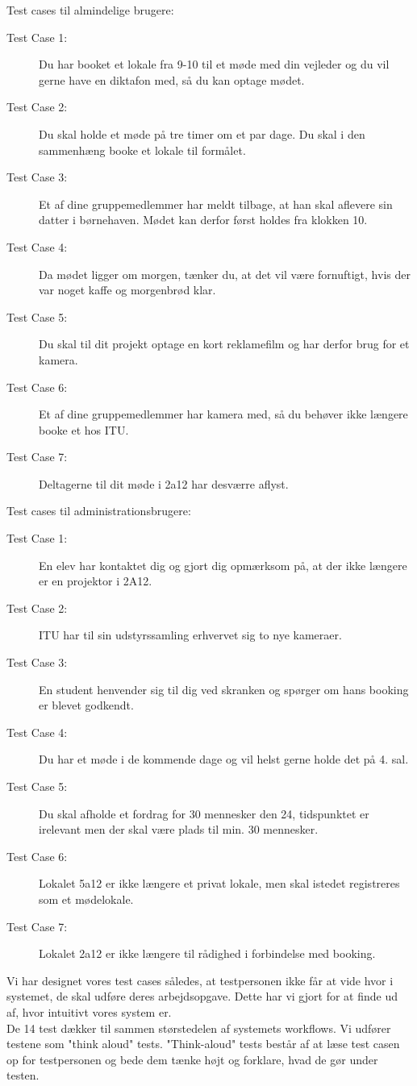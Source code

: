 Test cases til almindelige brugere:
\begin{description}
\item[Test Case 1:] Du har booket et lokale fra 9-10 til et møde med din vejleder og du vil gerne have en diktafon med, så du kan optage mødet.
\item[Test Case 2:] Du skal holde et møde på tre timer om et par dage. Du skal i den sammenhæng booke et lokale til formålet.
\item[Test Case 3:] Et af dine gruppemedlemmer har meldt tilbage, at han skal aflevere sin datter i børnehaven. Mødet kan derfor først holdes fra klokken 10.
\item[Test Case 4:] Da mødet ligger om morgen, tænker du, at det vil være fornuftigt, hvis der var noget kaffe og morgenbrød klar.
\item[Test Case 5:] Du skal til dit projekt optage en kort reklamefilm og har derfor brug for et kamera.
\item[Test Case 6:] Et af dine gruppemedlemmer har kamera med, så du behøver ikke længere booke et hos ITU.
\item[Test Case 7:] Deltagerne til dit møde i 2a12 har desværre aflyst.
\end{description}
Test cases til administrationsbrugere:
\begin{description}
\item[Test Case 1:] En elev har kontaktet dig og gjort dig opmærksom på, at der ikke længere er en projektor i 2A12.
\item[Test Case 2:] ITU har til sin udstyrssamling erhvervet sig to nye kameraer.
\item[Test Case 3:] En student henvender sig til dig ved skranken og spørger om hans booking er blevet godkendt.
\item[Test Case 4:] Du har et møde  i de kommende dage og vil helst gerne holde det på 4. sal.
\item[Test Case 5:] Du skal afholde et fordrag for 30 mennesker den 24, tidspunktet er irelevant men der skal være plads til min. 30 mennesker.
\item[Test Case 6:] Lokalet 5a12 er ikke længere et privat lokale, men skal istedet registreres som et mødelokale.
\item[Test Case 7:] Lokalet 2a12 er ikke længere til rådighed i forbindelse med booking.
\end{description}

Vi har designet vores test cases således, at testpersonen ikke får at vide hvor i systemet, de skal udføre deres arbejdsopgave. Dette har vi gjort for at finde ud af, hvor intuitivt vores system er.
\\De 14 test dækker til sammen størstedelen af systemets workflows. Vi udfører testene som "think aloud" tests\cite[s. 421]{SL_UID}. "Think-aloud" tests består af at læse test casen op for testpersonen og bede dem tænke højt og forklare, hvad de gør under testen.

